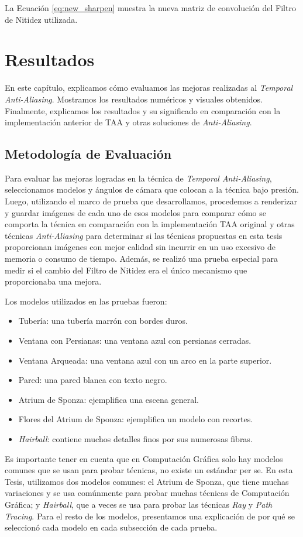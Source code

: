 \documentclass[pregrado]{tesis-usb} %
\begin{document}
La Ecuación \ref{eq:new_sharpen} muestra la nueva matriz de convolución del Filtro de Nitidez utilizada.


\chapter{Resultados}
En este capítulo, explicamos cómo evaluamos las mejoras realizadas al \textit{Temporal Anti-Aliasing}. Mostramos los resultados numéricos y visuales obtenidos. Finalmente, explicamos los resultados y su significado en comparación con la implementación anterior de TAA y otras soluciones de \textit{Anti-Aliasing}.

\section{Metodología de Evaluación}
Para evaluar las mejoras logradas en la técnica de \textit{Temporal Anti-Aliasing}, seleccionamos modelos y ángulos de cámara que colocan a la técnica bajo presión. Luego, utilizando el marco de prueba que desarrollamos, procedemos a renderizar y guardar imágenes de cada uno de esos modelos para comparar cómo se comporta la técnica en comparación con la implementación TAA original y otras técnicas \textit{Anti-Aliasing} para determinar si las técnicas propuestas en esta tesis proporcionan imágenes con mejor calidad sin incurrir en un uso excesivo de memoria o consumo de tiempo. Además, se realizó una prueba especial para medir si el cambio del Filtro de Nitidez era el único mecanismo que proporcionaba una mejora.

Los modelos utilizados en las pruebas fueron:
\begin{itemize}
\item Tubería: una tubería marrón con bordes duros.
\item Ventana con Persianas: una ventana azul con persianas cerradas.
\item Ventana Arqueada: una ventana azul con un arco en la parte superior.
\item Pared: una pared blanca con texto negro.
\item Atrium de Sponza: ejemplifica una escena general.
\item Flores del Atrium de Sponza: ejemplifica un modelo con recortes.
\item \textit{Hairball}: contiene muchos detalles finos por sus numerosas fibras.
\end{itemize}

Es importante tener en cuenta que en Computación Gráfica solo hay modelos comunes que se usan para probar técnicas, no existe un estándar per se. En esta Tesis, utilizamos dos modelos comunes: el Atrium de Sponza, que tiene muchas variaciones y se usa comúnmente para probar muchas técnicas de Computación Gráfica; y \textit{Hairball}, que a veces se usa para probar las técnicas \textit{Ray} y \textit{Path Tracing}. Para el resto de los modelos, presentamos una explicación de por qué se seleccionó cada modelo en cada subsección de cada prueba.
\end{document}
